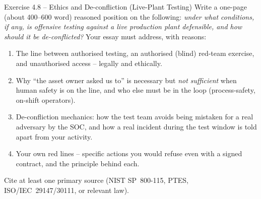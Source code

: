 \documentclass[11pt,a4paper]{article}
\begin{document}
\begin{taskbox}{Exercise 4.8 -- Ethics and De-confliction (Live-Plant Testing)}
Write a one-page (about 400--600 word) reasoned position on the following: \emph{under what
conditions, if any, is offensive testing against a live production plant defensible, and how should
it be de-conflicted?} Your essay must address, with reasons:
\begin{enumerate}\setlength{\itemsep}{0pt}
  \item The line between authorised testing, an authorised (blind) red-team exercise, and
        unauthorised access -- legally and ethically.
  \item Why ``the asset owner asked us to'' is necessary but \emph{not sufficient} when human safety
        is on the line, and who else must be in the loop (process-safety, on-shift operators).
  \item De-confliction mechanics: how the test team avoids being mistaken for a real adversary by
        the SOC, and how a real incident during the test window is told apart from your activity.
  \item Your own red lines -- specific actions you would refuse even with a signed contract, and the
        principle behind each.
\end{enumerate}
Cite at least one primary source (NIST SP~800-115, PTES, ISO/IEC~29147/30111, or relevant law).
\end{taskbox}
\end{document}
